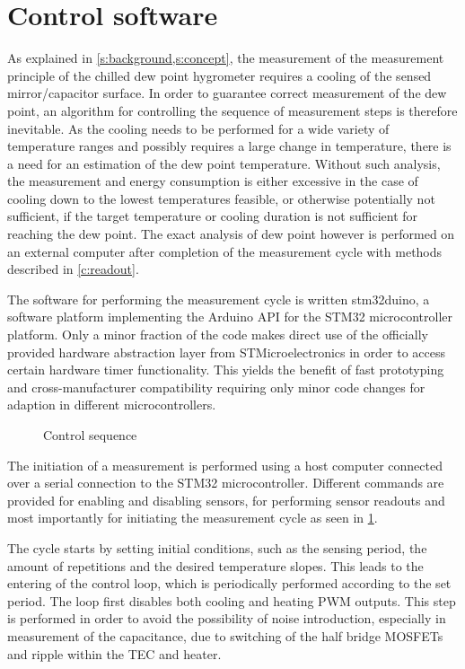 \section{Control software}\label{c:control}
As explained in \cref{s:background,s:concept}, the measurement of the measurement principle of the chilled dew point hygrometer requires a cooling of the sensed mirror/capacitor surface.
In order to guarantee correct measurement of the dew point, an algorithm for controlling the sequence of measurement steps is therefore inevitable. As the cooling needs to be performed for a wide variety of temperature ranges and possibly requires a large change in temperature, there is a need for an estimation of the dew point temperature. Without such analysis, the measurement and energy consumption is either excessive in the case of cooling down to the lowest temperatures feasible, or otherwise potentially not sufficient, if the target temperature or cooling duration is not sufficient for reaching the dew point.
The exact analysis of dew point however is performed on an external computer after completion of the measurement cycle with methods described in \cref{c:readout}.

The software for performing the measurement cycle is written stm32duino, a software platform implementing the Arduino API for the STM32 microcontroller platform. Only a minor fraction of the code makes direct use of the officially provided hardware abstraction layer from STMicroelectronics in order to access certain hardware timer functionality. This yields the benefit of fast prototyping and cross-manufacturer compatibility requiring only minor code changes for adaption in different microcontrollers.
\clearpage
\begin{figure}
    \centering
    \def\svgwidth{0.365\textwidth}
    
    \caption{Control sequence}
    \label{d:control}
    \vspace{-55pt}
\end{figure}

The initiation of a measurement is performed using a host computer connected over a serial connection to the STM32 microcontroller. Different commands are provided for enabling and disabling sensors, for performing sensor readouts and most importantly for initiating the measurement cycle as seen in \cref{d:control}.

The cycle starts by setting initial conditions, such as the sensing period, the amount of repetitions and the desired temperature slopes. This leads to the entering of the control loop, which is periodically performed according to the set period. The loop first disables both cooling and heating \gls{PWM} outputs. This step is performed in order to avoid the possibility of noise introduction, especially in measurement of the capacitance, due to switching of the half bridge \glspl{MOSFET} and ripple within the \gls{TEC} and heater. 

